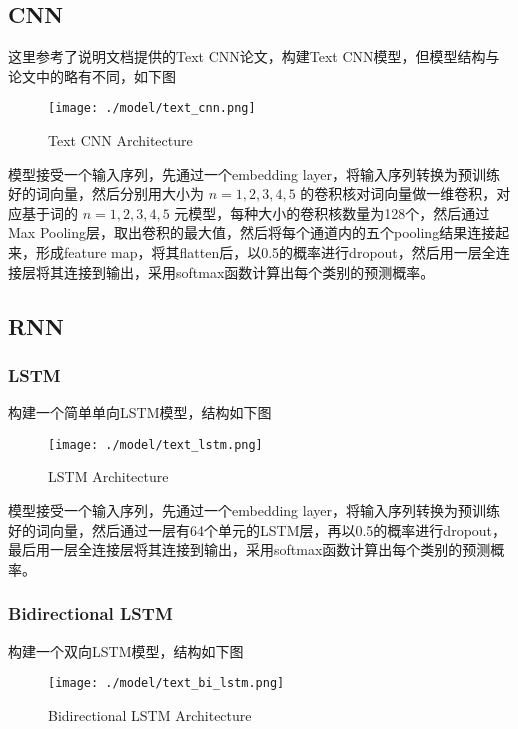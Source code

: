 \documentclass[12pt,a4paper]{article}
\begin{document}
\subsection{CNN}

这里参考了说明文档提供的Text CNN论文，构建Text
CNN模型，但模型结构与论文中的略有不同，如下图

\begin{figure}[H]
\centering
\texttt{[image: ./model/text\_cnn.png]}
\caption{Text CNN Architecture}
\end{figure}

模型接受一个输入序列，先通过一个embedding layer，将输入序列转换为预训练好的词向量，然后分别用大小为 \(n=1,2,3,4,5\) 的卷积核对词向量做一维卷积，对应基于词的 \(n=1,2,3,4,5\) 元模型，每种大小的卷积核数量为128个，然后通过Max Pooling层，取出卷积的最大值，然后将每个通道内的五个pooling结果连接起来，形成feature map，将其flatten后，以0.5的概率进行dropout，然后用一层全连接层将其连接到输出，采用softmax函数计算出每个类别的预测概率。

\subsection{RNN}

\subsubsection{LSTM}

构建一个简单单向LSTM模型，结构如下图

\begin{figure}[H]
\centering
\texttt{[image: ./model/text\_lstm.png]}
\caption{LSTM Architecture}
\end{figure}

模型接受一个输入序列，先通过一个embedding layer，将输入序列转换为预训练好的词向量，然后通过一层有64个单元的LSTM层，再以0.5的概率进行dropout，最后用一层全连接层将其连接到输出，采用softmax函数计算出每个类别的预测概率。

\subsubsection{Bidirectional LSTM}

构建一个双向LSTM模型，结构如下图

\begin{figure}[H]
\centering
\texttt{[image: ./model/text\_bi\_lstm.png]}
\caption{Bidirectional LSTM Architecture}
\end{figure}
\end{document}
